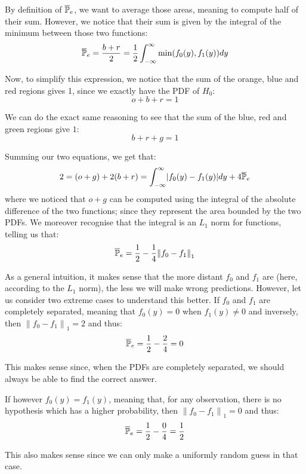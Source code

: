 \documentclass[a4paper]{article}
\begin{document}
{{        

        By definition of $\overline{\mathbb{P}}_e$, we want to average those areas, meaning to compute half of their sum. However, we notice that their sum is given by the integral of the minimum between those two functions:
        \[\bar{\prob}_e = \frac{b + r}{2} = \frac{1}{2} \int_{-\infty}^{\infty} \min\left(f_0\left(y\right), f_1\left(y\right)\right)dy\]

        Now, to simplify this expression, we notice that the sum of the orange, blue and red regions gives 1, since we exactly have the PDF of $H_0$: 
        \[o + b + r = 1\]

        We can do the exact same reasoning to see that the sum of the blue, red and green regions give $1$: 
        \[b + r + g = 1\]
        
        Summing our two equations, we get that: 
        \[2 = \left(o + g\right) + 2\left(b + r\right) = \int_{-\infty}^{\infty} \left|f_0\left(y\right) - f_1\left(y\right)\right|dy + 4\bar{\prob}_e\]
        where we noticed that $o + g$ can be computed using the integral of the absolute difference of the two functions; since they represent the area bounded by the two PDFs. We moreover recognise that the integral is an $L_1$ norm for functions, telling us that: 
        \[\bar{\prob}_e = \frac{1}{2} - \frac{1}{4} \left\|f_0 - f_1\right\|_1\]
        
        As a general intuition, it makes sense that the more distant $f_0$ and $f_1$ are (here, according to the $L_1$ norm), the less we will make wrong predictions. However, let us consider two extreme cases to understand this better. If $f_0$ and $f_1$ are completely separated, meaning that $f_0\left(y\right) = 0$ when $f_1\left(y\right) \neq 0$ and inversely, then $\left\|f_0 - f_1\right\|_1 = 2$ and thus:
        \[\overline{\mathbb{P}}_e = \frac{1}{2} - \frac{2}{4} = 0\]

        This makes sense since, when the PDFs are completely separated, we should always be able to find the correct answer.

        If however $f_0\left(y\right) = f_1\left(y\right)$, meaning that, for any observation, there is no hypothesis which has a higher probability, then $\left\|f_0 - f_1\right\|_1 = 0$ and thus: 
        \[\overline{\mathbb{P}}_e = \frac{1}{2} - \frac{0}{4} = \frac{1}{2}\]
        
        This also makes sense since we can only make a uniformly random guess in that case.
    }

}
\end{document}
